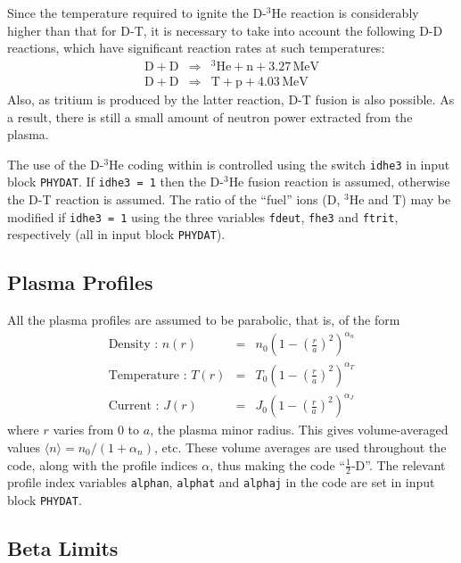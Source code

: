 Since the temperature required to ignite the D-$^3$He reaction is considerably
higher than that for D-T, it is necessary to take into account the following
D-D reactions, which have significant reaction rates at such temperatures:
\begin{eqnarray}
\mathrm{D + D} & \Longrightarrow & \mathrm{^{3}He + n + 3.27 \,MeV} \\
\mathrm{D + D} & \Longrightarrow & \mathrm{T + p + 4.03 \,MeV}
\end{eqnarray}
Also, as tritium is produced by the latter reaction, D-T fusion is also
possible. As a result, there is still a small amount of neutron power
extracted from the plasma.

The use of the D-$^3$He coding within \PS is controlled using the switch
\texttt{idhe3} in input block \texttt{PHYDAT}. If \texttt{idhe3 = 1} then the
D-$^3$He fusion reaction is assumed, otherwise the D-T reaction is
assumed. The ratio of the ``fuel'' ions (D, $^3$He and T) may be modified if
\texttt{idhe3 = 1} using the three variables \texttt{fdeut}, \texttt{fhe3} and
\texttt{ftrit}, respectively (all in input block \texttt{PHYDAT}).

\subsection{Plasma Profiles}
\setlength{\parskip}{0mm}
All the plasma profiles are assumed to be parabolic, that is, of the form
\begin{eqnarray}
\mbox{Density : } n(r) & = & n_0 \left( 1- \left(\frac{r}{a}\right)^2 \right)
^{\alpha_n} \\
\mbox{Temperature : } T(r) & = & T_0 \left( 1- \left(\frac{r}{a}\right)^2
\right) ^{\alpha_T} \\
\mbox{Current : } J(r) & = & J_0 \left( 1- \left(\frac{r}{a}\right)^2  \right)
^{\alpha_J}
\end{eqnarray}
where $r$ varies from 0 to $a$, the plasma minor radius. This gives
volume-averaged values $\langle n \rangle = n_0 / (1+\alpha_n)$, etc.  These
volume averages are used throughout the code, along with the profile indices
$\alpha$, thus making the code ``$\frac{1}{2}$-D''.  The relevant profile
index variables {\tt alphan}, {\tt alphat} and {\tt alphaj} in the code are
set in input block {\tt PHYDAT}.

\subsection{Beta Limits}

